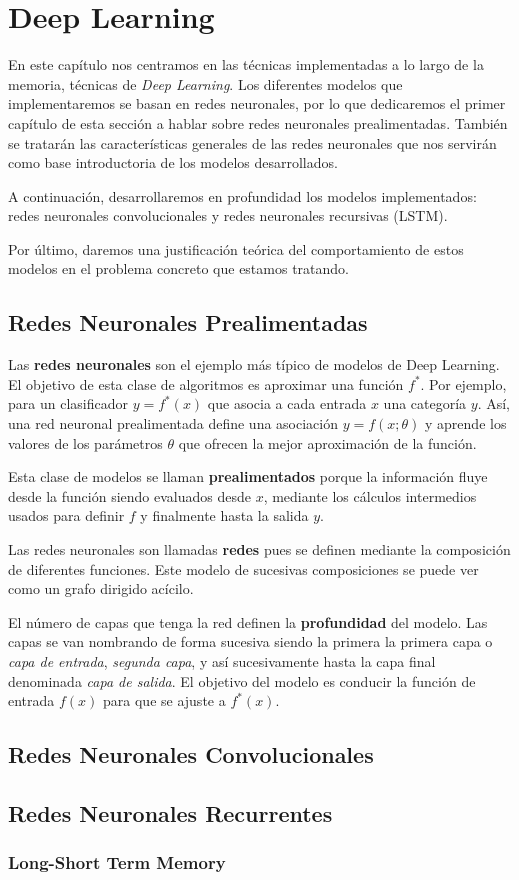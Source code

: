 \chapter{Deep Learning}

	En este capítulo nos centramos en las técnicas implementadas a lo largo de la memoria, técnicas de \textit{Deep Learning}. Los diferentes modelos que implementaremos se basan en redes neuronales, por lo que dedicaremos el primer capítulo de esta sección a hablar sobre redes neuronales prealimentadas. También se tratarán las características generales de las redes neuronales que nos servirán como base introductoria de los modelos desarrollados.
	
	A continuación, desarrollaremos en profundidad los modelos implementados: redes neuronales convolucionales y redes neuronales recursivas (LSTM). 
	
	Por último, daremos una justificación teórica del comportamiento de estos modelos en el problema concreto que estamos tratando.

\section{Redes Neuronales Prealimentadas}

Las \textbf{redes neuronales} son el ejemplo más típico de modelos de Deep Learning. El objetivo de esta clase de algoritmos es aproximar una función $f^*$. Por ejemplo, para un clasificador $y = f^*(x)$ que asocia a cada entrada $x$ una categoría $y$. Así, una red neuronal prealimentada define una asociación $y = f(x; \theta)$ y aprende los valores de los parámetros $\theta$ que ofrecen la mejor aproximación de la función.

Esta clase de modelos se llaman \textbf{prealimentados} porque la información fluye desde la función siendo evaluados desde $x$, mediante los cálculos intermedios usados para definir $f$ y finalmente hasta la salida $y$. 

Las redes neuronales son llamadas \textbf{redes} pues se definen mediante la composición de diferentes funciones. Este modelo de sucesivas composiciones se puede ver como un grafo dirigido acícilo. 

El número de capas que tenga la red definen la \textbf{profundidad} del modelo. Las capas se van nombrando de forma sucesiva siendo la primera la primera capa o \textit{capa de entrada}, \textit{segunda capa}, y así sucesivamente hasta la capa final denominada \textit{capa de salida}. El objetivo del modelo es conducir la función de entrada $f(x)$ para que se ajuste a $f^*(x)$. 

\section{Redes Neuronales Convolucionales}



\section{Redes Neuronales Recurrentes}

\subsection{Long-Short Term Memory}